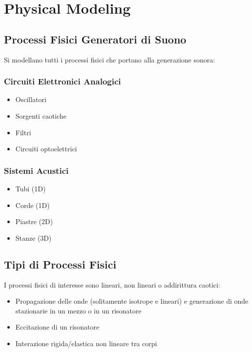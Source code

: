 \chapter{Physical Modeling}

\section{Processi Fisici Generatori di Suono}
Si modellano tutti i processi fisici che portano alla generazione sonora:

\subsection{Circuiti Elettronici Analogici}
\begin{itemize}
  \item Oscillatori
  \item Sorgenti caotiche
  \item Filtri
  \item Circuiti optoelettrici
\end{itemize}

\subsection{Sistemi Acustici}
\begin{itemize}
  \item Tubi (1D)
  \item Corde (1D)
  \item Piastre (2D)
  \item Stanze (3D)
\end{itemize}

\section{Tipi di Processi Fisici}
I processi fisici di interesse sono lineari, non lineari o addirittura caotici:

\begin{itemize}
  \item Propagazione delle onde (solitamente isotrope e lineari) e generazione di onde stazionarie in un mezzo o in un risonatore
  \item Eccitazione di un risonatore
  \item Interazione rigida/elastica non lineare tra corpi
\end{itemize}

